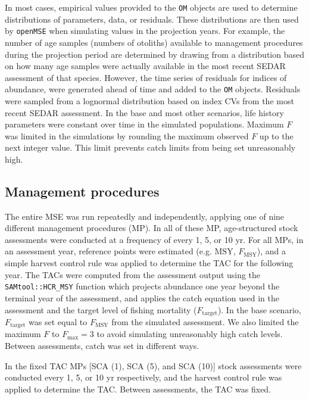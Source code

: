 \documentclass[12pt,english]{article}
\begin{document}
\begin{flushleft}
\begin{spacing}{1.9}
In most cases, empirical values provided to the \texttt{OM} objects are used to determine distributions of parameters, data, or residuals. These distributions are then used by \texttt{openMSE} when simulating values in the projection years. For example, the number of age samples (numbers of otoliths) available to management procedures during the projection period are determined by drawing from a distribution based on how many age samples were actually available in the most recent SEDAR assessment of that species. However, the time series of residuals for indices of abundance, were generated ahead of time and added to the \texttt{OM} objects. Residuals were sampled from a lognormal distribution based on index CVs from the most recent SEDAR assessment. In the base and most other scenarios, life history parameters were constant over time in the simulated populations. Maximum $F$ was limited in the simulations by rounding the maximum observed $F$ up to the next integer value. This limit prevents catch limits from being set unreasonably high.

\subsection*{Management procedures}

The entire MSE was run repeatedly and independently, applying one of nine different management procedures (MP). In all of these MP, age-structured stock assessments were conducted at a frequency of every 1, 5, or 10 yr. For all MPs, in an assessment year, reference points were estimated (e.g. $\mathrm{MSY}$, $F_{\mathrm{MSY}}$), and a simple harvest control rule was applied to determine the TAC for the following year. The TACs were computed from the assessment output using the \texttt{SAMtool::HCR\_MSY} function which projects abundance one year beyond the terminal year of the assessment, and applies the catch equation used in the assessment and the target level of fishing mortality ($F_{\mathrm{target}}$). In the base scenario, $F_{\mathrm{target}}$ was set equal to $F_{\mathrm{MSY}}$ from the simulated assessment. We also limited the maximum $F$ to $F_{\mathrm{max}}=3$ to avoid simulating unreasonably high catch levels. Between assessments, catch was set in different ways.

In the fixed TAC MPs [SCA (1), SCA (5), and SCA (10)] stock assessments were conducted every 1, 5, or 10 yr respectively, and the harvest control rule was applied to determine the TAC. Between assessments, the TAC was fixed.


\end{spacing}
\end{flushleft}
\end{document}
